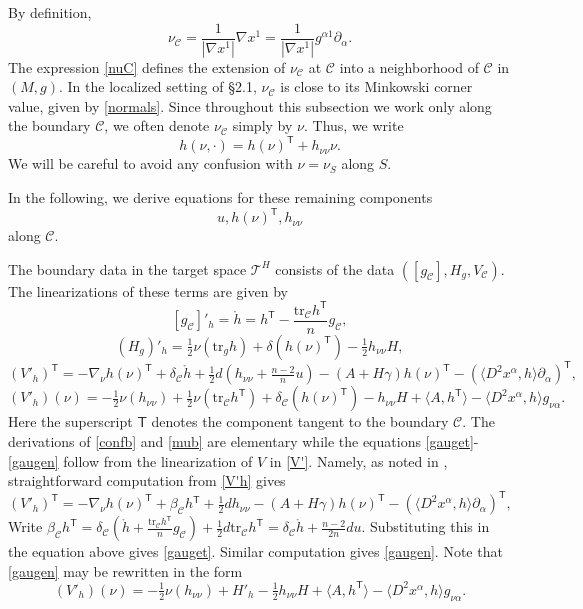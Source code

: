 \documentclass[10pt]{amsart}
\renewcommand{\a}{\alpha}
\renewcommand{\b}{\beta}
\newcommand{\g}{\gamma}
\renewcommand{\d}{\delta}
\newcommand{\cC}{{\mathcal C}}
\newcommand{\cT}{{\mathcal T}}
\newcommand{\tT}{\mathsf{T}}
\newcommand{\be}{\begin{equation}}
\newcommand{\ee}{\end{equation}}
\newcommand{\tr}{\mathrm{tr}}
\newcommand{\p}{\partial}
\newcommand{\<}{\langle}
\renewcommand{\>}{\rangle}
\theoremstyle{plain}
\theoremstyle{remark}
\theoremstyle{definition}
\numberwithin{equation}{section}
\begin{document}
  By definition, 
 \be \label{nuC}
\nu_{\cC} = \frac{1}{|\nabla x^1|}\nabla x^1 =  \frac{1}{|\nabla x^1|}g^{\a1}\p_{\a}.
\ee
The expression \eqref{nuC} defines the extension of $\nu_{\cC}$ at $\cC$ into a neighborhood of $\cC$ in $(M, g)$. 
In the localized setting of \S 2.1, $\nu_{\cC}$ is close to its Minkowski corner value, given by \eqref{normals}. Since throughout this subsection we 
work only along the boundary $\cC$, we often denote $\nu_{\cC}$ simply by $\nu$. Thus, we write 
$$h(\nu, \cdot) = h(\nu)^{\tT} + h_{\nu \nu}\nu.$$ 
We will be careful to avoid any confusion with $\nu = \nu_S$ along $S$. 

\medskip 

   In the following, we derive equations for these remaining components 
$$u, h(\nu)^{\tT}, h_{\nu \nu}$$
along $\cC$.  


  The boundary data in the target space $\cT^H$ consists of the data $([g_{\cC}], H_g, V_{\cC})$. The linearizations of these terms 
are given by 
\be \label{confb}
[g_{\cC}]'_h = \ring{h} = h^{\tT} - \frac{\tr_{\cC}h^{\tT}}{n}g_{\cC},
\ee
\be \label{mub}
(H_g)'_h = \tfrac{1}{2}\nu(\tr_g h) + \d(h(\nu)^{\tT}) - \tfrac{1}{2}h_{\nu\nu}H, 
\ee
\be \label{gauget}
(V'_h)^{\tT} = - \nabla_{\nu}h(\nu)^{\tT} + \d_{\cC}\ring{h}+ \tfrac{1}{2}d (h_{\nu \nu} + \tfrac{n-2}{n}u) - (A + H\g)h(\nu)^{\tT} - (\<D^2 x^{\a}, h\>\p_{\a})^{\tT},
\ee
\be \label{gaugen}
(V'_h)(\nu) = -\tfrac{1}{2}\nu(h_{\nu \nu}) + \tfrac{1}{2}\nu(\tr_{\cC}h^{\tT}) + \d_{\cC}(h(\nu)^{\tT}) - h_{\nu \nu}H + \<A, h^{\tT}\> - \<D^2 x^{\a}, h\>g_{\nu \a}. 
\ee 
Here the superscript $\tT$ denotes the component tangent to the boundary $\cC$. The derivations of \eqref{confb} and \eqref{mub} are elementary while 
the equations \eqref{gauget}-\eqref{gaugen} follow from the linearization of $V$ in \eqref{V'}. Namely, as noted in \cite{I}, straightforward 
computation from \eqref{V'h} gives 
$$(V'_h)^{\tT} = - \nabla_{\nu}h(\nu)^{\tT} + \b_{\cC}h{^\tT}+ \tfrac{1}{2}d h_{\nu \nu} - (A + H\g)h(\nu)^{\tT} - (\<D^2 x^{\a}, h\>\p_{\a})^{\tT},$$
Write $\b_{\cC}h^{\tT} = \d_{\cC}(\ring{h} + \frac{\tr_{\cC}h^{\tT}}{n}g_{\cC}) + \frac{1}{2}d\tr_{\cC}h^{\tT} = \d_{\cC}\ring{h} + \frac{n-2}{2n}d u$. 
Substituting this in the equation above gives \eqref{gauget}. Similar computation gives \eqref{gaugen}. Note that \eqref{gaugen} may be rewritten in 
the form 
\be \label{gaugen2}
(V'_h)(\nu) = -\tfrac{1}{2}\nu(h_{\nu \nu}) + H'_h - \tfrac{1}{2}h_{\nu \nu}H + \<A, h^{\tT}\> - \<D^2 x^{\a}, h\>g_{\nu \a}. 
\ee 

\medskip 
 
\end{document}
